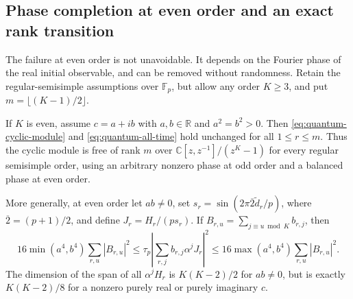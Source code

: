 \subsection{Phase completion at even order and an exact rank transition}
The failure at even order is not unavoidable. It depends on the Fourier phase
of the real initial observable, and can be removed without randomness.
Retain the regular-semisimple assumptions over $\mathbb F_p$, but allow any
order $K\ge3$, and put $m=\lfloor(K-1)/2\rfloor$.
\begin{theorem}\label{thm:phase-completion}
If $K$ is even, assume $c=a+ib$ with $a,b\in\mathbb R$ and $a^2=b^2>0$.
Then \eqref{eq:quantum-cyclic-module} and \eqref{eq:quantum-all-time} hold
unchanged for all $1\le r\le m$. Thus the cyclic module is free of rank $m$
over $\mathbb C[z,z^{-1}]/(z^K-1)$ for every regular semisimple order,
using an arbitrary nonzero phase at odd order and a balanced phase at even order.

More generally, at even order let $ab\ne0$, set
$s_r=\sin(2\pi \overline2\widetilde d_r/p)$, where
$\overline2=(p+1)/2$, and define $J_r=H_r/(ps_r)$. If
$B_{r,u}=\sum_{j\equiv u\bmod K}b_{r,j}$, then
\[
 16\min(a^4,b^4)\sum_{r,u}|B_{r,u}|^2
 \le\tau_p\left|\sum_{r,j}b_{r,j}\alpha^jJ_r\right|^2
 \le16\max(a^4,b^4)\sum_{r,u}|B_{r,u}|^2.
\]
The dimension of the span of all $\alpha^jH_r$ is $K(K-2)/2$ for $ab\ne0$,
but is exactly $K(K-2)/8$ for a nonzero purely real or purely imaginary $c$.
\end{theorem}

